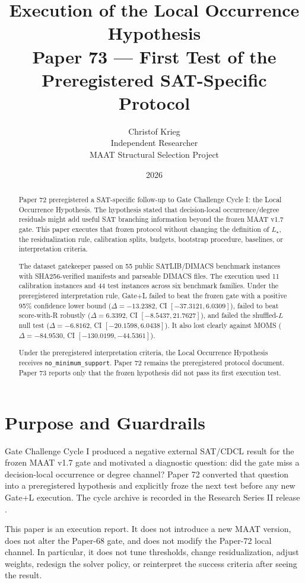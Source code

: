 \documentclass[11pt,a4paper]{article}
\title{\textbf{Execution of the Local Occurrence Hypothesis}\\
\large Paper 73 --- First Test of the Preregistered SAT-Specific Protocol}
\author{Christof Krieg\\
\small Independent Researcher\\
\small MAAT Structural Selection Project}
\date{2026}
\newcommand{\Lstar}{L_\star}
\begin{document}
\maketitle

\begin{abstract}
Paper 72 preregistered a SAT-specific follow-up to Gate Challenge Cycle I:
the Local Occurrence Hypothesis. The hypothesis stated that decision-local
occurrence/degree residuals might add useful SAT branching information beyond
the frozen MAAT v1.7 gate. This paper executes that frozen protocol without
changing the definition of $\Lstar$, the residualization rule, calibration
splits, budgets, bootstrap procedure, baselines, or interpretation criteria.

The dataset gatekeeper passed on 55 public SATLIB/DIMACS benchmark instances
with SHA256-verified manifests and parseable DIMACS files. The execution used
11 calibration instances and 44 test instances across six benchmark families.
Under the preregistered interpretation rule, Gate+L failed to beat the frozen
gate with a positive 95\% confidence lower bound
($\Delta=-13.2382$, CI $[-37.3121,6.0309]$), failed to beat score-with-R
robustly ($\Delta=6.3392$, CI $[-8.5437,21.7627]$), and failed the
shuffled-$L$ null test ($\Delta=-6.8162$, CI $[-20.1598,6.0438]$). It also
lost clearly against MOMS ($\Delta=-84.9530$, CI $[-130.0199,-44.5361]$).

Under the preregistered interpretation criteria, the Local Occurrence
Hypothesis receives \texttt{no\_minimum\_support}. Paper 72 remains the
preregistered protocol document. Paper 73 reports only that the frozen
hypothesis did not pass its first execution test.
\end{abstract}

\section{Purpose and Guardrails}

Gate Challenge Cycle I produced a negative external SAT/CDCL result for the
frozen MAAT v1.7 gate and motivated a diagnostic question: did the gate miss a
decision-local occurrence or degree channel? Paper 72 converted that question
into a preregistered hypothesis and explicitly froze the next test before any
new Gate+L execution. The cycle archive is recorded in the Research Series II
release \cite{seriesii}.

This paper is an execution report. It does not introduce a new MAAT version,
does not alter the Paper-68 gate, and does not modify the Paper-72 local
channel. In particular, it does not tune thresholds, change residualization,
adjust weights, redesign the solver policy, or reinterpret the success
criteria after seeing the result.
\end{document}
